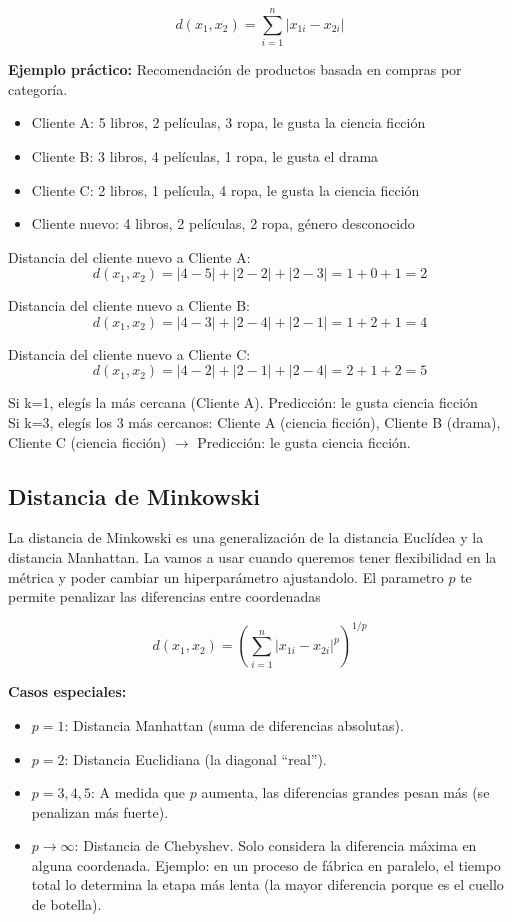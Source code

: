 \documentclass[12pt]{article}
\begin{document}
\[d(x_1, x_2) = \sum_{i=1}^{n} |x_{1i} - x_{2i}|\]

\textbf{Ejemplo práctico:} Recomendación de productos basada en compras por categoría.

\begin{itemize}
    \item Cliente A: 5 libros, 2 películas, 3 ropa, le gusta la ciencia ficción
    \item Cliente B: 3 libros, 4 películas, 1 ropa, le gusta el drama  
    \item Cliente C: 2 libros, 1 película, 4 ropa, le gusta la ciencia ficción
    \item Cliente nuevo: 4 libros, 2 películas, 2 ropa, género desconocido
\end{itemize}

Distancia del cliente nuevo a Cliente A: 
\[d(x_1, x_2) = |4-5| + |2-2| + |2-3| = 1 + 0 + 1 = 2\]

Distancia del cliente nuevo a Cliente B: 
\[d(x_1, x_2) = |4-3| + |2-4| + |2-1| = 1 + 2 + 1 = 4\]

Distancia del cliente nuevo a Cliente C: 
\[d(x_1, x_2) = |4-2| + |2-1| + |2-4| = 2 + 1 + 2 = 5\]

Si k=1, elegís la más cercana (Cliente A). Predicción: le gusta ciencia ficción \\
Si k=3, elegís los 3 más cercanos: Cliente A (ciencia ficción), Cliente B (drama), Cliente C (ciencia ficción) $\rightarrow$ Predicción: le gusta ciencia ficción.

\subsection{Distancia de Minkowski}

La distancia de Minkowski es una generalización de la distancia Euclídea y la distancia Manhattan. La vamos a usar cuando queremos tener flexibilidad en la métrica y poder cambiar un hiperparámetro ajustandolo. El parametro $p$ te permite penalizar las diferencias entre coordenadas

\[d(x_1, x_2) = \left(\sum_{i=1}^{n} |x_{1i} - x_{2i}|^p\right)^{1/p}\]

\textbf{Casos especiales:}
\begin{itemize}
    \item $p=1$: Distancia Manhattan (suma de diferencias absolutas).
    \item $p=2$: Distancia Euclidiana (la diagonal ``real'').
    \item $p=3,4,5$: A medida que $p$ aumenta, las diferencias grandes pesan más (se penalizan más fuerte).
    \item $p \to \infty$: Distancia de Chebyshev. Solo considera la diferencia máxima en alguna coordenada. 
    Ejemplo: en un proceso de fábrica en paralelo, el tiempo total lo determina la etapa más lenta (la mayor diferencia porque es el cuello de botella).
\end{itemize}
\end{document}
